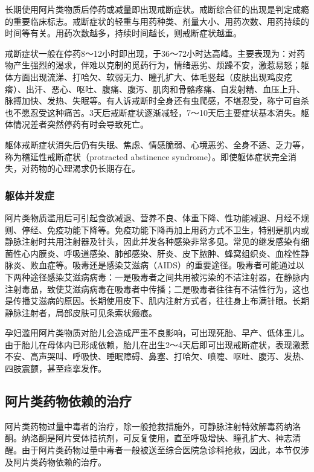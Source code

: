 长期使用阿片类物质后停药或减量即出现戒断症状。戒断综合征的出现是判定成瘾的重要临床标志。戒断症状的轻重与用药种类、剂量大小、用药次数、用药持续的时间等有关。用药次数越多，持续时间越长，则戒断症状越重。

戒断症状一般在停药8～12小时即出现，于36～72小时达高峰。主要表现为：对药物产生强烈的渴求，伴难以克制的觅药行为，情绪恶劣、烦躁不安，激惹易怒；躯体方面出现流涕、打哈欠、软弱无力、瞳孔扩大、体毛竖起（皮肤出现鸡皮疙瘩）、出汗、恶心、呕吐、腹痛、腹泻、肌肉和骨骼疼痛、自发射精、血压上升、脉搏加快、发热、失眠等。有人诉戒断时全身还有虫爬感，不堪忍受，称宁可自杀也不愿忍受这种痛苦。3天后戒断症状逐渐减轻，7～10天后主要症状基本消失。躯体情况差者突然停药有时会导致死亡。

躯体戒断症状消失后仍有失眠、焦虑、情感脆弱、心境恶劣、全身不适、乏力等，称为稽延性戒断症状（protracted
abstinence
syndrome）。即使躯体症状完全消失，对药物的心理渴求仍长期存在。

\subsubsection{躯体并发症}

阿片类物质滥用后可引起食欲减退、营养不良、体重下降、性功能减退、月经不规则、停经、免疫功能下降等。免疫功能下降再加上用药方式不卫生，特别是肌内或静脉注射时共用注射器及针头，因此并发各种感染非常多见。常见的继发感染有细菌性心内膜炎、呼吸道感染、肺部感染、肝炎、皮下脓肿、蜂窝组织炎、血栓性静脉炎、败血症等。吸毒还是感染艾滋病（AIDS）的重要途径。吸毒者可能通过以下两种途径感染艾滋病病毒：一是吸毒者之间共用被污染的不洁注射器，在静脉内注射毒品，致使艾滋病病毒在吸毒者中传播；二是吸毒者往往有不洁性行为，这也是传播艾滋病的原因。长期使用皮下、肌内注射方式者，往往身上布满针眼。长期静脉注射者，局部皮肤可见条索状瘢痕。

孕妇滥用阿片类物质对胎儿会造成严重不良影响，可出现死胎、早产、低体重儿。由于胎儿在母体内已形成依赖，胎儿在出生2～4天后即可出现戒断症状，表现激惹不安、高声哭叫、呼吸快、睡眠障碍、鼻塞、打哈欠、喷嚏、呕吐、腹泻、发热、四肢震颤，甚至痉挛发作。

\subsection{阿片类药物依赖的治疗}

阿片类药物过量中毒者的治疗，除一般抢救措施外，可静脉注射特效解毒药纳洛酮。纳洛酮是阿片受体拮抗剂，可反复使用，直至呼吸增快、瞳孔扩大、神志清醒。由于阿片类药物过量中毒者一般被送至综合医院急诊科抢救，因此，本节仅涉及阿片类药物依赖的治疗。

